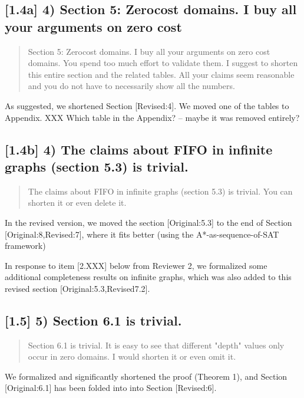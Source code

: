 \documentclass{article}
\begin{document}
\subsection{[1.4a] 4) Section 5: Zerocost domains. I buy all your arguments on zero cost}
\label{sec:orgheadline4}

\begin{quote}
Section 5: Zerocost domains. I buy all your arguments on zero cost
domains. You spend too much effort to validate them. I suggest to
shorten this entire section and the related tables. All your claims
seem reasonable and you do not have to necessarily show all the
numbers.
\end{quote}

As suggested, we shortened Section [Revised:4].
We moved one of the tables to Appendix. XXX Which table in the Appendix? -- maybe it was removed entirely?

\subsection{[1.4b]  4)  The claims about FIFO in infinite graphs (section 5.3) is trivial.}
\label{sec:orgheadline5}

\begin{quote}
The claims about FIFO in infinite graphs (section 5.3) is trivial. You can shorten it or even delete it.
\end{quote}

In the revised version, we moved the section [Original:5.3] to the end of Section [Original:8,Revised:7],
where it fits better (using the A*-as-sequence-of-SAT framework)

In response to item [2.XXX] below from Reviewer 2, 
we formalized some additional completeness results on infinite graphs, which was also added to this revised section [Original:5.3,Revised7.2].

\subsection{[1.5] 5) Section 6.1 is trivial.}
\label{sec:orgheadline6}

\begin{quote}
Section 6.1 is trivial. It is easy to see that different "depth"
values only occur in zero domains. I would shorten it or even omit it.
\end{quote}

We formalized and significantly shortened the proof (Theorem 1),
and  Section [Original:6.1] has been folded into into Section [Revised:6].
\end{document}
